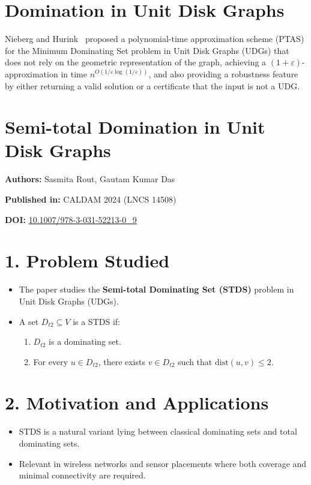 \documentclass{article}
\title{}
\date{}
\begin{document}
\maketitle

\section*{Domination in Unit Disk Graphs}
Nieberg and Hurink~\cite{nieberg2006ptas} proposed a polynomial-time approximation scheme (PTAS) for the Minimum Dominating Set problem in Unit Disk Graphs (UDGs) that does not rely on the geometric representation of the graph, achieving a $(1+\varepsilon)$-approximation in time $n^{O(1/\varepsilon \log (1/\varepsilon))}$, and also providing a robustness feature by either returning a valid solution or a certificate that the input is not a UDG.


\section*{Semi-total Domination in Unit Disk Graphs}


\textbf{Authors:} Sasmita Rout, Gautam Kumar Das

\textbf{Published in:} CALDAM 2024 (LNCS 14508)

\textbf{DOI:} \href{https://doi.org/10.1007/978-3-031-52213-0_9}{10.1007/978-3-031-52213-0\_9}

\vspace{1em}

\section*{1. Problem Studied}
\begin{itemize}[leftmargin=1.5em]
    \item The paper studies the \textbf{Semi-total Dominating Set (STDS)} problem in Unit Disk Graphs (UDGs).
    \item A set \( D_{t2} \subseteq V \) is a STDS if:
    \begin{enumerate}
        \item \( D_{t2} \) is a dominating set.
        \item For every \( u \in D_{t2} \), there exists \( v \in D_{t2} \) such that \( \text{dist}(u,v) \leq 2 \).
    \end{enumerate}
\end{itemize}

\section*{2. Motivation and Applications}
\begin{itemize}[leftmargin=1.5em]
    \item STDS is a natural variant lying between classical dominating sets and total dominating sets.
    \item Relevant in wireless networks and sensor placements where both coverage and minimal connectivity are required.
\end{itemize}
\end{document}
